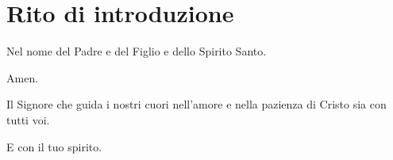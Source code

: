 
\section*{Rito di introduzione}

\begin{dialoghi}
	\item[\sacerdote] Nel nome del Padre e del Figlio e dello Spirito Santo.
	\item[\tutti] Amen.
	\item[\sacerdote] Il Signore che guida i nostri cuori nell'amore e nella pazienza di Cristo sia con tutti voi.
	\item[\tutti] E con il tuo spirito.
\end{dialoghi}

